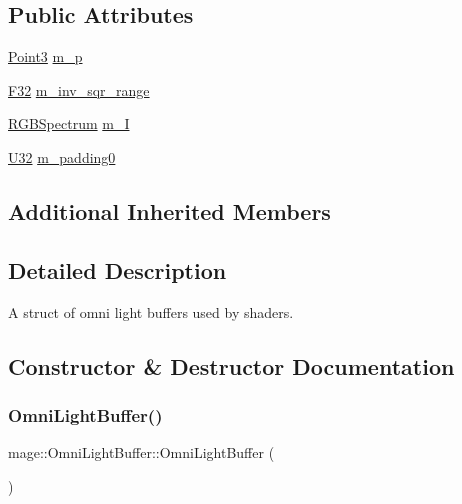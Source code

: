 \subsection*{Public Attributes}
\begin{DoxyCompactItemize}
\item 
\hyperlink{structmage_1_1_point3}{Point3} \hyperlink{structmage_1_1_omni_light_buffer_a777b98a686a7e39bd7b401748629d9fc}{m\+\_\+p}
\item 
\hyperlink{namespacemage_aa97e833b45f06d60a0a9c4fc22ae02c0}{F32} \hyperlink{structmage_1_1_omni_light_buffer_a156d844a76bb2a98859263128740a95b}{m\+\_\+inv\+\_\+sqr\+\_\+range}
\item 
\hyperlink{structmage_1_1_r_g_b_spectrum}{R\+G\+B\+Spectrum} \hyperlink{structmage_1_1_omni_light_buffer_ac3273113ad647103c911bbbf6bb41697}{m\+\_\+I}
\item 
\hyperlink{namespacemage_a41c104c036fba3756a74e19f793eeaa1}{U32} \hyperlink{structmage_1_1_omni_light_buffer_af75a020722cd8eb37b91fe42a5b0ad5c}{m\+\_\+padding0}
\end{DoxyCompactItemize}
\subsection*{Additional Inherited Members}


\subsection{Detailed Description}
A struct of omni light buffers used by shaders. 

\subsection{Constructor \& Destructor Documentation}
\hypertarget{structmage_1_1_omni_light_buffer_a2cb95cb8ba07182d04b610b1c4c49be1}{}\label{structmage_1_1_omni_light_buffer_a2cb95cb8ba07182d04b610b1c4c49be1} 
\subsubsection{\texorpdfstring{Omni\+Light\+Buffer()}{OmniLightBuffer()}\hspace{0.1cm}{\footnotesize\ttfamily [1/3]}}
{\footnotesize\ttfamily mage\+::\+Omni\+Light\+Buffer\+::\+Omni\+Light\+Buffer (\begin{DoxyParamCaption}{ }\end{DoxyParamCaption})}

